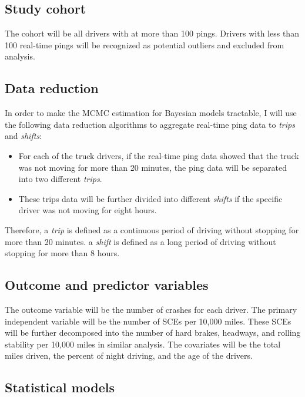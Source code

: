 \documentclass[12pt]{book}
\numberwithin{equation}{chapter}
\providecommand{\tightlist}{%
  \setlength{\itemsep}{0pt}\setlength{\parskip}{0pt}}
\begin{document}
\hypertarget{study-cohort}{%
\subsection{Study cohort}\label{study-cohort}}

The cohort will be all drivers with at more than 100 pings. Drivers with less than 100 real-time pings will be recognized as potential outliers and excluded from analysis.

\hypertarget{data-reduction}{%
\subsection{Data reduction}\label{data-reduction}}

In order to make the MCMC estimation for Bayesian models tractable, I will use the following data reduction algorithms to aggregate real-time ping data to \emph{trips} and \emph{shifts}:

\begin{itemize}
\tightlist
\item
  For each of the truck drivers, if the real-time ping data showed that the truck was not moving for more than 20 minutes, the ping data will be separated into two different \emph{trips}.
\item
  These trips data will be further divided into different \emph{shifts} if the specific driver was not moving for eight hours.
\end{itemize}

Therefore, a \emph{trip} is defined as a continuous period of driving without stopping for more than 20 minutes. a \emph{shift} is defined as a long period of driving without stopping for more than 8 hours.

\hypertarget{outcome-and-predictor-variables}{%
\subsection{Outcome and predictor variables}\label{outcome-and-predictor-variables}}

The outcome variable will be the number of crashes for each driver. The primary independent variable will be the number of SCEs per 10,000 miles. These SCEs will be further decomposed into the number of hard brakes, headways, and rolling stability per 10,000 miles in similar analysis. The covariates will be the total miles driven, the percent of night driving, and the age of the drivers.

\hypertarget{statistical-models}{%
\subsection{Statistical models}\label{statistical-models}}
\end{document}
